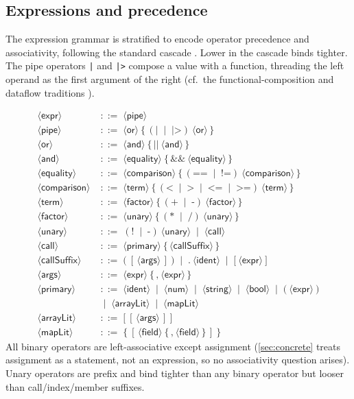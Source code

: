 \documentclass[11pt,a4paper]{article}
\theoremstyle{plain}
\theoremstyle{definition}
\theoremstyle{remark}
\newcommand{\nt}[1]{\ensuremath{\langle\textsf{#1}\rangle}}  %
\newcommand{\opt}[1]{\ensuremath{[\,#1\,]}}               %
\newcommand{\rep}[1]{\ensuremath{\{\,#1\,\}}}             %
\newcommand{\bnfeq}{\;::=\;}
\newcommand{\bnfor}{\;\mid\;}
\begin{document}
\subsection{Expressions and precedence}
\label{sec:exprgrammar}

The expression grammar is stratified to encode operator precedence and
associativity, following the standard cascade \citep{aho2006}. Lower in the
cascade binds tighter. The pipe operators \texttt{|} and \texttt{|>} compose a
value with a function, threading the left operand as the first argument of the
right (cf.\ the functional-composition and dataflow traditions
\citep{wadler1992,backus1959}).

\begin{align*}
\nt{expr}       &\bnfeq \nt{pipe}\\
\nt{pipe}       &\bnfeq \nt{or}\ \rep{(\texttt{|}\bnfor\texttt{|>})\ \nt{or}}\\
\nt{or}         &\bnfeq \nt{and}\ \rep{\texttt{||}\ \nt{and}}\\
\nt{and}        &\bnfeq \nt{equality}\ \rep{\texttt{\&\&}\ \nt{equality}}\\
\nt{equality}   &\bnfeq \nt{comparison}\
                        \rep{(\texttt{==}\bnfor\texttt{!=})\ \nt{comparison}}\\
\nt{comparison} &\bnfeq \nt{term}\
                        \rep{(\texttt{<}\bnfor\texttt{>}\bnfor\texttt{<=}
                        \bnfor\texttt{>=})\ \nt{term}}\\
\nt{term}       &\bnfeq \nt{factor}\
                        \rep{(\texttt{+}\bnfor\texttt{-})\ \nt{factor}}\\
\nt{factor}     &\bnfeq \nt{unary}\
                        \rep{(\texttt{*}\bnfor\texttt{/})\ \nt{unary}}\\
\nt{unary}      &\bnfeq (\texttt{!}\bnfor\texttt{-})\ \nt{unary}
                        \bnfor \nt{call}\\
\nt{call}       &\bnfeq \nt{primary}\
                        \rep{\nt{callSuffix}}\\
\nt{callSuffix} &\bnfeq \texttt{(}\ \opt{\nt{args}}\ \texttt{)}
                        \bnfor \texttt{.}\ \nt{ident}
                        \bnfor \texttt{[}\ \nt{expr}\ \texttt{]}\\
\nt{args}       &\bnfeq \nt{expr}\ \rep{\texttt{,}\ \nt{expr}}\\
\nt{primary}    &\bnfeq \nt{ident}\bnfor\nt{num}\bnfor\nt{string}\bnfor\nt{bool}
                        \bnfor \texttt{(}\ \nt{expr}\ \texttt{)}\\
                &\bnfor \nt{arrayLit}\bnfor\nt{mapLit}\\
\nt{arrayLit}   &\bnfeq \texttt{[}\ \opt{\nt{args}}\ \texttt{]}\\
\nt{mapLit}     &\bnfeq \texttt{\{}\ \opt{\nt{field}\
                        \rep{\texttt{,}\ \nt{field}}}\ \texttt{\}}
\end{align*}
All binary operators are left-associative except assignment (\cref{sec:concrete}
treats assignment as a statement, not an expression, so no associativity
question arises). Unary operators are prefix and bind tighter than any binary
operator but looser than call/index/member suffixes.
\end{document}
